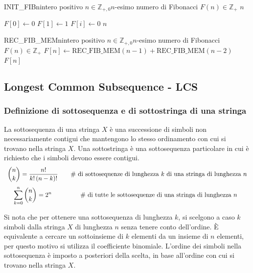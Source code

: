 \begin{algo}{INIT\_FIB}{n}{intero positivo $n \in \mathbb{Z}_{+,0}$}{$n$-esimo numero di Fibonacci $F(n) \in \mathbb{Z}_{+}$}
		\State \Return \(n\)
	\EndIf

	\State
	\State \(F[0] \gets 0\)
	\State \(F[1] \gets 1\)
		\State \(F[i] \gets 0\)
	\EndFor
	\State \Return {}\(n\)
\end{algo}

\begin{algo}{REC\_FIB\_MEM}{n}{intero positivo $n \in \mathbb{Z}_{+,0}$}{$n$-esimo numero di Fibonacci $F(n) \in \mathbb{Z}_{+}$}
		\State \(F[n] \gets \text{REC\_FIB\_MEM}(n-1) + \text{REC\_FIB\_MEM}(n-2)\)
	\EndIf
	\State \Return \(F[n]\)
\end{algo}

\newpage

\subsection{Longest Common Subsequence - LCS}
\subsubsection*{Definizione di sottosequenza e di sottostringa di una stringa}
La sottosequenza di una stringa \(X\) è una successione di simboli non necessariamente contigui che mantengono lo stesso
ordinamento con cui si trovano nella stringa \(X\). Una sottostringa è una sottosequenza particolare in cui è richiesto
che i simboli devono essere contigui.
\[\begin{array}{c c}
	\displaystyle \binom{n}{k} = \frac{n!}{k! \, (n-k)!} & \quad \text{\# di sottosequenze di lunghezza \(k\) di una stringa di lunghezza \(n\)} \\[13pt]
	\displaystyle \sum_{k=0}^{n} \binom{n}{k} = 2^n & \quad \text{\# di tutte le sottosequenze di una stringa di lunghezza \(n\)}
\end{array}\]

\noindent
Si nota che per ottenere una sottosequenza di lunghezza \(k\), si scelgono a caso \(k\) simboli dalla stringa \(X\) di lunghezza
\(n\) senza tenere conto dell'ordine. È equivalente a cercare un sottoinsieme di \(k\) elementi da un insieme di \(n\)
elementi, per questo motivo si utilizza il coefficiente binomiale. L'ordine dei simboli nella sottosequenza è imposto a
posteriori della scelta, in base all'ordine con cui si trovano nella stringa \(X\).

